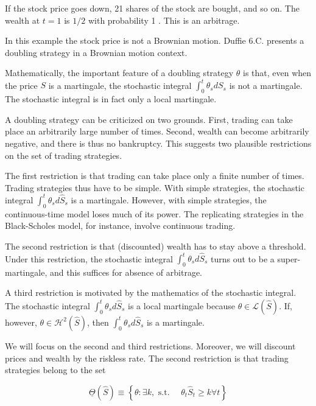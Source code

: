 \documentclass[\topdir/lecture\_notes.tex]{subfiles}
\begin{document}
If the stock price goes down, 21 shares of the stock are bought, and so on. The wealth at \(t=1\) is \(1 / 2\) with probability 1 . This is an arbitrage.

In this example the stock price is not a Brownian motion. Duffie 6.C. presents a doubling strategy in a Brownian motion context.

Mathematically, the important feature of a doubling strategy \(\theta\) is that, even when the price \(S\) is a martingale, the stochastic integral \(\int_{0}^{t} \theta_{s} d S_{s}\) is not a martingale. The stochastic integral is in fact only a local martingale.

A doubling strategy can be criticized on two grounds. First, trading can take place an arbitrarily large number of times. Second, wealth can become arbitrarily negative, and there is thus no bankruptcy. This suggests two plausible restrictions on the set of trading strategies.

The first restriction is that trading can take place only a finite number of times. Trading strategies thus have to be simple. With simple strategies, the stochastic integral \(\int_{0}^{t} \theta_{s} d \hat{S}_{s}\) is a martingale. However, with simple strategies, the continuous-time model loses much of its power. The replicating strategies in the Black-Scholes model, for instance, involve continuous trading.

The second restriction is that (discounted) wealth has to stay above a threshold. Under this restriction, the stochastic integral \(\int_{0}^{t} \theta_{s} d \hat{S}_{s}\) turns out to be a super-martingale, and this suffices for absence of arbitrage.

A third restriction is motivated by the mathematics of the stochastic integral. The stochastic integral \(\int_{0}^{t} \theta_{s} d \hat{S}_{s}\) is a local martingale because \(\theta \in \mathcal{L}(\hat{S})\). If, however, \(\theta \in \mathcal{H}^{2}(\hat{S})\), then \(\int_{0}^{t} \theta_{s} d \hat{S}_{s}\) is a martingale.

We will focus on the second and third restrictions. Moreover, we will discount prices and wealth by the riskless rate. The second restriction is that trading strategies belong to the set

\begin{equation*}
\underline{\Theta}(\hat{S}) \equiv\left\{\theta: \exists k, \text { s.t. } \quad \theta_{t} \hat{S}_{t} \geq k \forall t\right\}
\end{equation*}
\end{document}
